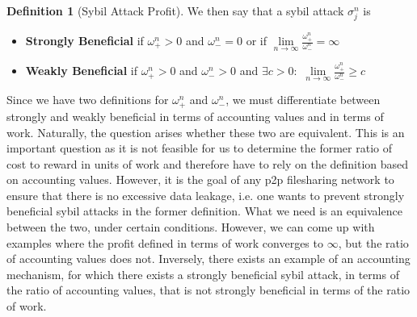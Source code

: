 \documentclass[11pt,a4paper]{report}
\theoremstyle{definition}
\newtheorem{definition}{Definition}[section]
\theoremstyle{theorem}
\theoremstyle{proposition}
\theoremstyle{corollary}
\theoremstyle{lemma}
\theoremstyle{example}
\theoremstyle{remark}
\begin{document}
\begin{definition}[Sybil Attack Profit]
\noindent{}We then say that a sybil attack $\sigma^n_j$ is
\begin{itemize}
\item[] {\bf Strongly Beneficial} if $\omega^n_{+}>0$ and $\omega^n_{-}=0$ or if $\lim\limits_{n\rightarrow\infty}\frac{\omega^n_{+}}{\omega^n_{-}}=\infty$
\item[] {\bf Weakly Beneficial} if $\omega^n_{+}>0$ and $\omega^n_{-}>0$ and $\exists c>0:\,\,\lim\limits_{n\rightarrow\infty}\frac{\omega^n_{+}}{\omega^n_{-}}\geq{}c$
\end{itemize}
\noindent{}Since we have two definitions for $\omega^n_{+}$ and $\omega^n_{-}$, we must differentiate between strongly and weakly beneficial in terms of accounting values and in terms of work. Naturally, the question arises whether these two are equivalent. This is an important question as it is not feasible for us to determine the former ratio of cost to reward in units of work and therefore have to rely on the definition based on accounting values. However, it is the goal of any p2p filesharing network to ensure that there is no excessive data leakage, i.e. one wants to prevent strongly beneficial sybil attacks in the former definition. What we need is an equivalence between the two, under certain conditions. However, we can come up with examples where the profit defined in terms of work converges to $\infty$, but the ratio of accounting values does not. Inversely, there exists an example of an accounting mechanism, for which there exists a strongly beneficial sybil attack, in terms of the ratio of accounting values, that is not strongly beneficial in terms of the ratio of work. \vspace{1em}\\
\end{definition}
\end{document}
